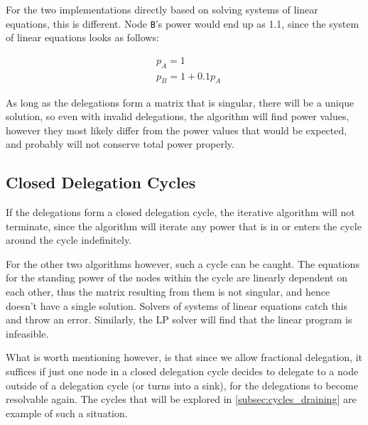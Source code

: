 For the two implementations directly based on solving systems of linear equations, this is different. Node \texttt{B}'s power would end up as 1.1, since the system of linear equations looks as follows:

\begin{align*}
& p_A = 1 \\
& p_B = 1 + 0.1p_A
\end{align*}

As long as the delegations form a matrix that is singular, there will be a unique solution, so even with invalid delegations, the algorithm will find power values, however they most likely differ from the power values that would be expected, and probably will not conserve total power properly. 

\subsection{Closed Delegation Cycles}

If the delegations form a closed delegation cycle, the iterative algorithm will not terminate, since the algorithm will iterate any power that is in or enters the cycle around the cycle indefinitely. 

For the other two algorithms however, such a cycle can be caught. The equations for the standing power of the nodes within the cycle are linearly dependent on each other, thus the matrix resulting from them is not singular, and hence doesn't have a single solution. Solvers of systems of linear equations catch this and throw an error. Similarly, the LP solver will find that the linear program is infeasible.

What is worth mentioning however, is that since we allow fractional delegation, it suffices if just one node in a closed delegation cycle decides to delegate to a node outside of a delegation cycle (or turns into a sink), for the delegations to become resolvable again. The cycles that will be explored in \cref{subsec:cycles_draining} are example of such a situation. 
